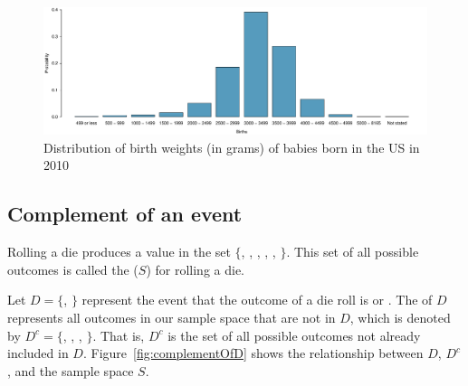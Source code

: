 \begin{figure}[h]
	\includegraphics[width=\textwidth]{ch_probability_oi_biostat/figures/birthwtMarginalDist/birthwtMarginalDist.pdf}
	\caption{Distribution of birth weights (in grams) of babies born in the US in 2010}
	\label{fig:birthwtMarginalDist}
\end{figure}


\subsection{Complement of an event}

Rolling a die produces a value in the set $\{$, , , , , $\}$. This set of all possible outcomes is called the  ($S$) for rolling a die. 

Let $D=\{$, $\}$ represent the event that the outcome of a die roll is  or . The  of $D$ represents all outcomes in our sample space that are not in $D$, which is denoted by $D^c = \{$, , , $\}$. That is, $D^c$ is the set of all possible outcomes not already included in $D$. Figure~\ref{fig:complementOfD} shows the relationship between $D$, $D^c$, and the sample space $S$. 


